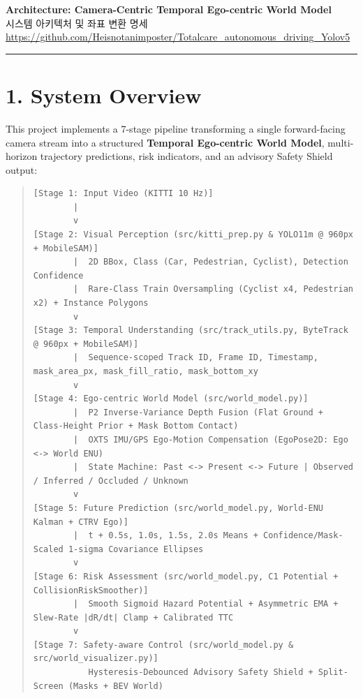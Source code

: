 \documentclass[10.5pt,a4paper]{article}
\begin{document}
\begin{center}
{\LARGE\bfseries Architecture: Camera-Centric Temporal Ego-centric World Model}\\[6pt]
{\normalsize\color{gray} 시스템 아키텍처 및 좌표 변환 명세}\\[4pt]
{\small\href{https://github.com/Heisnotanimposter/Totalcare_autonomous_driving_Yolov5}{https://github.com/Heisnotanimposter/Totalcare\_autonomous\_driving\_Yolov5}}
\end{center}
\vspace{4pt}
\hrule
\vspace{8pt}

\section{1. System Overview}

This project implements a 7-stage pipeline transforming a single forward-facing camera stream into a structured \textbf{Temporal Ego-centric World Model}, multi-horizon trajectory predictions, risk indicators, and an advisory Safety Shield output:


\begin{quote}\begin{footnotesize}\begin{verbatim}
[Stage 1: Input Video (KITTI 10 Hz)]
        |
        v
[Stage 2: Visual Perception (src/kitti_prep.py & YOLO11m @ 960px + MobileSAM)]
        |  2D BBox, Class (Car, Pedestrian, Cyclist), Detection Confidence
        |  Rare-Class Train Oversampling (Cyclist x4, Pedestrian x2) + Instance Polygons
        v
[Stage 3: Temporal Understanding (src/track_utils.py, ByteTrack @ 960px + MobileSAM)]
        |  Sequence-scoped Track ID, Frame ID, Timestamp, mask_area_px, mask_fill_ratio, mask_bottom_xy
        v
[Stage 4: Ego-centric World Model (src/world_model.py)]
        |  P2 Inverse-Variance Depth Fusion (Flat Ground + Class-Height Prior + Mask Bottom Contact)
        |  OXTS IMU/GPS Ego-Motion Compensation (EgoPose2D: Ego <-> World ENU)
        |  State Machine: Past <-> Present <-> Future | Observed / Inferred / Occluded / Unknown
        v
[Stage 5: Future Prediction (src/world_model.py, World-ENU Kalman + CTRV Ego)]
        |  t + 0.5s, 1.0s, 1.5s, 2.0s Means + Confidence/Mask-Scaled 1-sigma Covariance Ellipses
        v
[Stage 6: Risk Assessment (src/world_model.py, C1 Potential + CollisionRiskSmoother)]
        |  Smooth Sigmoid Hazard Potential + Asymmetric EMA + Slew-Rate |dR/dt| Clamp + Calibrated TTC
        v
[Stage 7: Safety-aware Control (src/world_model.py & src/world_visualizer.py)]
           Hysteresis-Debounced Advisory Safety Shield + Split-Screen (Masks + BEV World)
\end{verbatim}\end{footnotesize}\end{quote}
\end{document}
